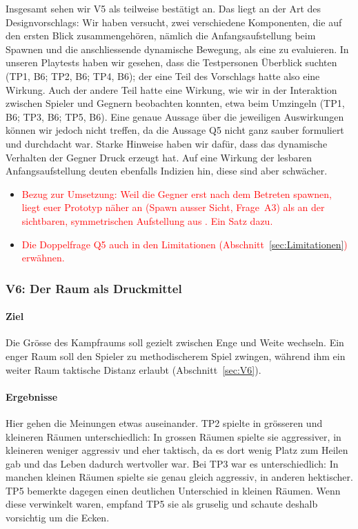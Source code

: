 \documentclass[../Main.tex]{subfiles}
\begin{document}
Insgesamt sehen wir V5 als teilweise bestätigt an. Das liegt an der Art des Designvorschlags: Wir haben versucht, zwei verschiedene Komponenten, die auf den ersten Blick zusammengehören, nämlich die Anfangsaufstellung beim Spawnen und die anschliessende dynamische Bewegung, als eine zu evaluieren. In unseren Playtests haben wir gesehen, dass die Testpersonen Überblick suchten (TP1, B6; TP2, B6; TP4, B6); der eine Teil des Vorschlags hatte also eine Wirkung. Auch der andere Teil hatte eine Wirkung, wie wir in der Interaktion zwischen Spieler und Gegnern beobachten konnten, etwa beim Umzingeln (TP1, B6; TP3, B6; TP5, B6). Eine genaue Aussage über die jeweiligen Auswirkungen können wir jedoch nicht treffen, da die Aussage Q5 nicht ganz sauber formuliert und durchdacht war. Starke Hinweise haben wir dafür, dass das dynamische Verhalten der Gegner Druck erzeugt hat. Auf eine Wirkung der lesbaren Anfangsaufstellung deuten ebenfalls Indizien hin, diese sind aber schwächer.

\begin{itemize}[leftmargin=1.5cm]
    \item \textcolor{red}{Bezug zur Umsetzung: Weil die Gegner erst nach dem Betreten spawnen, liegt euer Prototyp näher an  (Spawn ausser Sicht, Frage~A3) als an der sichtbaren, symmetrischen Aufstellung aus . Ein Satz dazu.}
    \item \textcolor{red}{Die Doppelfrage Q5 auch in den Limitationen (Abschnitt~\ref{sec:Limitationen}) erwähnen.}
\end{itemize}

\subsubsection{V6: Der Raum als Druckmittel}

\paragraph{Ziel}
Die Grösse des Kampfraums soll gezielt zwischen Enge und Weite wechseln. Ein enger Raum soll den Spieler zu methodischerem Spiel zwingen, während ihm ein weiter Raum taktische Distanz erlaubt (Abschnitt~\ref{sec:V6}).

\paragraph{Ergebnisse}
Hier gehen die Meinungen etwas auseinander. TP2 spielte in grösseren und kleineren Räumen unterschiedlich: In grossen Räumen spielte sie aggressiver, in kleineren weniger aggressiv und eher taktisch, da es dort wenig Platz zum Heilen gab und das Leben dadurch wertvoller war. Bei TP3 war es unterschiedlich: In manchen kleinen Räumen spielte sie genau gleich aggressiv, in anderen hektischer. TP5 bemerkte dagegen einen deutlichen Unterschied in kleinen Räumen. Wenn diese verwinkelt waren, empfand TP5 sie als gruselig und schaute deshalb vorsichtig um die Ecken.
\end{document}
